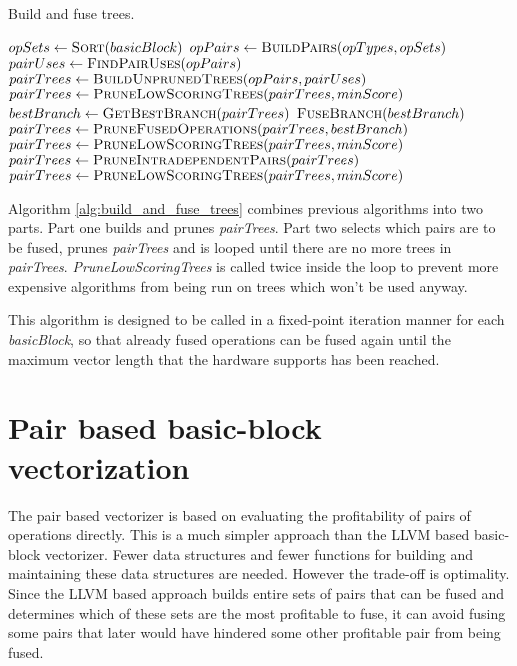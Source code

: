 \documentclass[12pt,a4paper,onecolumn,twoside,openright]{report}
\begin{document}
\begin{algorithm}[H]
	\caption{Build and fuse trees.} \label{alg:build_and_fuse_trees}
	\small
	\begin{algorithmic}
		\State $opSets \gets \Call{Sort}{basicBlock}$
		\State $opPairs \gets \Call{BuildPairs}{opTypes, opSets}$
		\State $pairUses \gets \Call{FindPairUses}{opPairs}$
		\State $pairTrees \gets \Call{BuildUnprunedTrees}{opPairs, pairUses}$
		\State $pairTrees \gets \Call{PruneLowScoringTrees}{pairTrees, minScore}$
		\State %
			\State $bestBranch \gets \Call{GetBestBranch}{pairTrees}$
			\State $\Call{FuseBranch}{bestBranch}$
			\State $pairTrees \gets \Call{PruneFusedOperations}{pairTrees, bestBranch}$
			\State $pairTrees \gets \Call{PruneLowScoringTrees}{pairTrees, minScore}$
			\State $pairTrees \gets \Call{PruneIntradependentPairs}{pairTrees}$
			\State $pairTrees \gets \Call{PruneLowScoringTrees}{pairTrees, minScore}$
		\EndWhile
	\EndFunction
	\end{algorithmic}
\end{algorithm}
Algorithm \ref{alg:build_and_fuse_trees} combines previous algorithms into two parts. Part one builds and prunes \textit{pairTrees}. Part two selects which pairs are to be fused, prunes \textit{pairTrees} and is looped until there are no more trees in \textit{pairTrees}. \textit{PruneLowScoringTrees} is called twice inside the loop to prevent more expensive algorithms from being run on trees which won't be used anyway.

This algorithm is designed to be called in a fixed-point iteration manner for each \textit{basicBlock}, so that already fused operations can be fused again until the maximum vector length that the hardware supports has been reached.


\section{Pair based basic-block vectorization}
The pair based vectorizer is based on evaluating the profitability of pairs of operations directly. This is a much simpler approach than the LLVM based basic-block vectorizer. Fewer data structures and fewer functions for building and maintaining these data structures are needed. However the trade-off is optimality. Since the LLVM based approach builds entire sets of pairs that can be fused and determines which of these sets are the most profitable to fuse, it can avoid fusing some pairs that later would have hindered some other profitable pair from being fused.
\\
\end{document}
